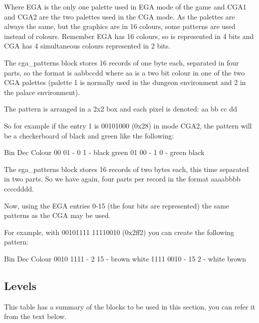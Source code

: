 \documentclass{article}
\begin{document}
 Where  EGA is the only one palette used in EGA mode of the game and CGA1
 and CGA2 are the two palettes used in the  CGA mode.
 As the palettes are always the same, but the graphics are in 16 colours,
 some patterns are used instead of colours.
 Remember EGA has 16 colours, so is represented in 4 bits and CGA has 4
 simultaneous colours represented in 2 bits.

 The cga\_patterns block stores 16 records of one byte each, separated in
 four parts, so the format is aabbccdd where aa is a two bit colour in one
 of the two CGA palettes (palette 1 is normally used in the  dungeon
 environment and 2 in the palace environment).
 
 The pattern is arranged in a 2x2 box and each pixel is denoted:
  aa bb
  cc dd
 
 So for example if the entry 1 is 00101000 (0x28) in mode CGA2, the pattern
 will be a checkerboard of black and green like the following:

  Bin       Dec     Colour
  00 01  -  0 1  -  black  green
  01 00  -  1 0  -  green  black

 The ega\_patterns block stores 16 records of two bytes each, this time
 separated in two parts. So we have again, four parts per record in the
 format aaaabbbb ccccdddd.
 
 Now, using the EGA entries 0-15 (the four bits are represented) the same
 patterns as the CGA may be used.
 
 For example, with 00101111 11110010 (0x2ff2) you can create the following
 pattern:

  Bin           Dec       Colour
  0010 1111  -  2  15  -  brown  white
  1111 0010  -  15 2   -  white  brown

\subsection{Levels \label{level blocks}}
 This table has a summary of the blocks to be used in this section,
 you can refer it from the text below.
\end{document}
